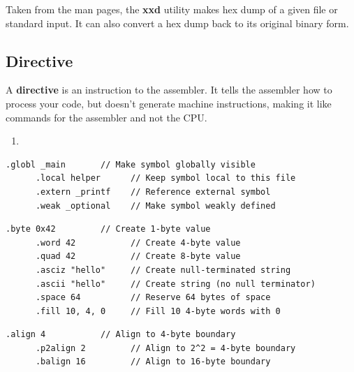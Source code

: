   \begin{definition}
    \label{def:xxd}
    Taken from the man pages, the \textbf{xxd} utility makes hex dump of a given file or standard input. It can also convert a hex dump back to its original binary form. 
  \end{definition} 

\subsection{Directive}

  \begin{definition}[Directive]
    \label{def:directive}
    A \textbf{directive} is an instruction to the assembler. It tells the assembler how to process your code, but doesn't generate machine instructions, making it like commands for the assembler and not the CPU. 

    \begin{enumerate}
      \item 
    \end{enumerate}
  \end{definition}

  \begin{example}
    \label{ex:symbol-control}
    \begin{lstlisting}[language=assembly]
      .globl _main       // Make symbol globally visible
      .local helper      // Keep symbol local to this file
      .extern _printf    // Reference external symbol
      .weak _optional    // Make symbol weakly defined
    \end{lstlisting}
  \end{example}

  \begin{example}
    \label{ex:data-creation}
    \begin{lstlisting}[language=assembly]
      .byte 0x42         // Create 1-byte value
      .word 42           // Create 4-byte value  
      .quad 42           // Create 8-byte value
      .asciz "hello"     // Create null-terminated string
      .ascii "hello"     // Create string (no null terminator)
      .space 64          // Reserve 64 bytes of space
      .fill 10, 4, 0     // Fill 10 4-byte words with 0
    \end{lstlisting}
  \end{example}

  \begin{example}[Alignment]
    \label{ex:alignment}
    \begin{lstlisting}[language=assembly]
      .align 4           // Align to 4-byte boundary
      .p2align 2         // Align to 2^2 = 4-byte boundary  
      .balign 16         // Align to 16-byte boundary
    \end{lstlisting}
  \end{example}

